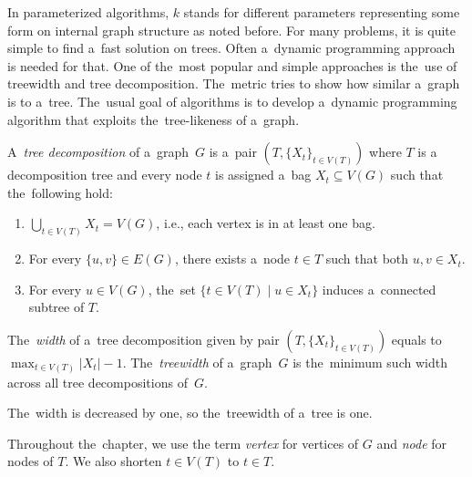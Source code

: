 In parameterized algorithms, \( k \) stands for different parameters
representing some form on internal graph structure as noted before.
%
For many problems, it is quite simple to find a~fast solution on trees.
Often a~dynamic programming approach is needed for that.
%
One of the~most popular and simple approaches
is the~use of treewidth and tree decomposition.
The~metric tries to show how similar a~graph is to a~tree.
%
The~usual goal of algorithms is to develop a~dynamic programming algorithm
that exploits the~tree-likeness of a~graph.

%
\begin{definition}
	A~\emph{tree decomposition} of a~graph~\( G \) is
	a~pair \( (T, {\{X_t\}}_{t \in V ( T )}) \)
	where \( T \) is a decomposition tree and every node \( t \)
	is assigned a~bag \( X_t \subseteq V(G) \) such that the~following hold:
	\begin{enumerate}
		\item \( \bigcup_{t \in V(T)} X_t = V(G) \),
		      i.e., each vertex is in at least one bag.
		\item For every \( \{u,v\} \in E(G) \), there exists
		      a~node \( t \in T \) such that both \( u, v \in X_t \).
		\item For every \( u \in V(G) \),
		      the~set \( \{t \in V(T) \mid u \in X_t\} \)
		      induces a~connected subtree of \( T \).
	\end{enumerate}
\end{definition}
%
\begin{definition}
	The~\emph{width} of a~tree decomposition given by pair
	\( (T, {\{X_t\}}_{t \in V ( T )}) \)
	equals to \( \max_{t\in V(T)} |X_t| - 1 \).
	The~\emph{treewidth} of a~graph~\( G \) is the~minimum such width
	across all tree decompositions of~\( G \).
\end{definition}
%
The~width is decreased by one, so the~treewidth of a~tree is one.

Throughout the~chapter, we use the term \emph{vertex} for vertices of \( G \)
and \emph{node} for nodes of \( T \).
We also shorten \( t \in V(T) \) to \( t \in T \).

